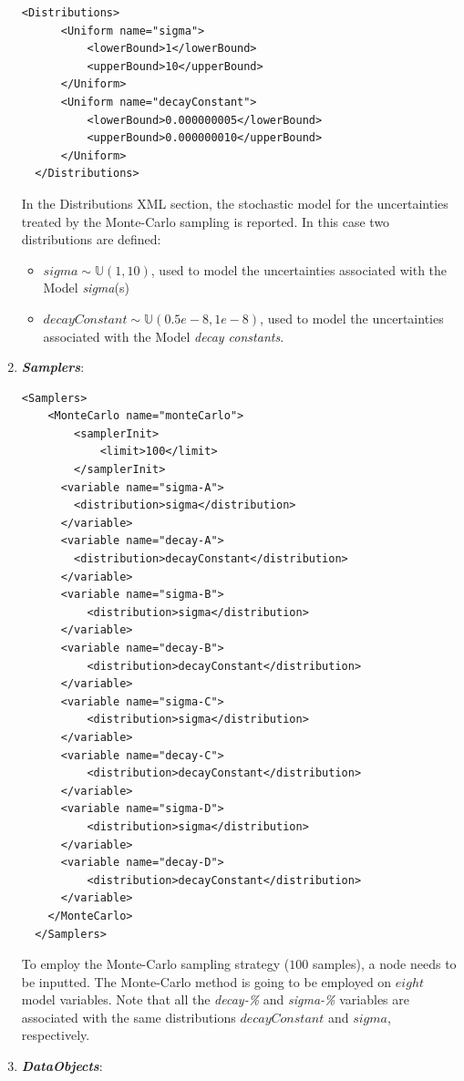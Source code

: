 \begin{enumerate}
\begin{lstlisting}[style=XML,morekeywords={arg,extension,pauseAtEnd,overwrite}]
  <Distributions>
      <Uniform name="sigma">
          <lowerBound>1</lowerBound>
          <upperBound>10</upperBound>
      </Uniform>
      <Uniform name="decayConstant">
          <lowerBound>0.000000005</lowerBound>
          <upperBound>0.000000010</upperBound>
      </Uniform>
  </Distributions>   
\end{lstlisting}
  In the Distributions XML section, the stochastic model for the 
  uncertainties  treated by the Monte-Carlo sampling is reported. In 
  this case two distributions are defined: 
  \begin{itemize}
    \item $sigma \sim \mathbb{U}(1,10)$, used to model the uncertainties 
    associated with  the Model \textit{sigma}(s)
    \item  $decayConstant \sim \mathbb{U}(0.5e-8,1e-8)$,  used to 
    model the uncertainties 
    associated with  the Model \textit{decay constants}.
  \end{itemize}
   \item \textbf{\textit{Samplers}}:
\begin{lstlisting}[style=XML,morekeywords={arg,extension,pauseAtEnd,overwrite}]
  <Samplers>
    <MonteCarlo name="monteCarlo">
        <samplerInit>
            <limit>100</limit>
        </samplerInit>
      <variable name="sigma-A">
        <distribution>sigma</distribution>
      </variable>
      <variable name="decay-A">
        <distribution>decayConstant</distribution>
      </variable>
      <variable name="sigma-B">
          <distribution>sigma</distribution>
      </variable>
      <variable name="decay-B">
          <distribution>decayConstant</distribution>
      </variable>
      <variable name="sigma-C">
          <distribution>sigma</distribution>
      </variable>
      <variable name="decay-C">
          <distribution>decayConstant</distribution>
      </variable>
      <variable name="sigma-D">
          <distribution>sigma</distribution>
      </variable>
      <variable name="decay-D">
          <distribution>decayConstant</distribution>
      </variable>
    </MonteCarlo>
  </Samplers>   
\end{lstlisting}
  To employ the Monte-Carlo sampling strategy ($100$ samples), a 
   node needs to be inputted.  The 
  Monte-Carlo method is going to be employed on $eight$ model variables.
  Note that all the \textit{decay-\%} and 
  \textit{sigma-\%} variables are associated with the same distributions 
  $decayConstant$ and $sigma$, respectively.  
   \item \textbf{\textit{DataObjects}}:

\end{enumerate}
